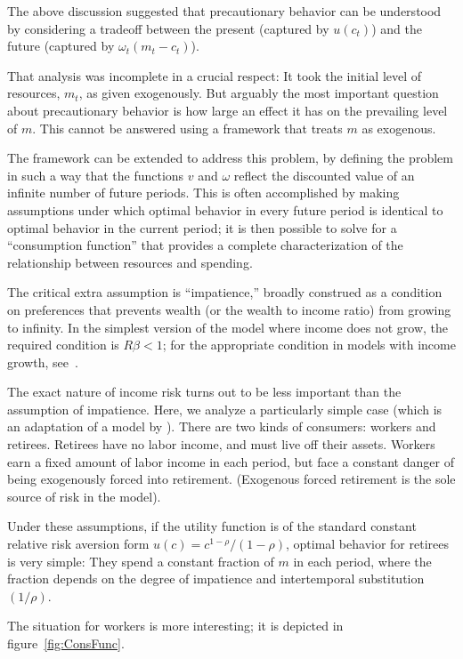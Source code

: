 
The above discussion suggested that precautionary behavior can be understood by considering a tradeoff between
the present (captured by $u(c_{t})$) and the future (captured by ${\omega}_{t}({m}_{t}-{c}_{t})$).

That analysis was incomplete in a crucial respect: It took the initial
level of resources, ${m}_{t}$, as given exogenously.  But arguably the
most important question about precautionary behavior is how large an
effect it has on the prevailing level of ${m}$. This cannot be
answered using a framework that treats ${m}$ as exogenous.

The framework can be extended to address this problem, by defining the
problem in such a way that the functions $v$ and ${\omega}$ reflect
the discounted value of an infinite number of future periods.  This is
often accomplished by making assumptions under which optimal behavior
in every future period is identical to optimal behavior in the current
period; it is then possible to solve for a ``consumption function''
that provides a complete characterization of the relationship between
resources and spending.

The critical extra assumption is ``impatience,'' broadly construed as a condition
on preferences that prevents wealth (or the wealth to income ratio) from growing to infinity.  In the simplest version
of the model where income does not grow, the required condition is
$R\beta < 1$; for the appropriate condition in models with income growth,
see~\cite{BufferStockTheory}.

The exact nature of income risk turns out to be less important than
the assumption of impatience.  Here, we analyze a particularly simple
case (which is an adaptation of a model by \cite{toche:urisk}).  There
are two kinds of consumers: workers and retirees.  Retirees have no
labor income, and must live off their assets.  Workers earn a fixed
amount of labor income in each period, but face a constant danger of
being exogenously forced into retirement. (Exogenous forced retirement
is the sole source of risk in the model).

Under these assumptions, if the utility function is of the standard constant relative risk aversion form
$u(c)=c^{1-\rho}/(1-\rho)$, optimal behavior for retirees is very simple: They spend a constant
fraction of ${m}$ in each period, where the fraction depends on the degree of impatience and 
intertemporal substitution $(1/\rho)$.

The situation for workers is more interesting; it is depicted in
figure~\ref{fig:ConsFunc}.

